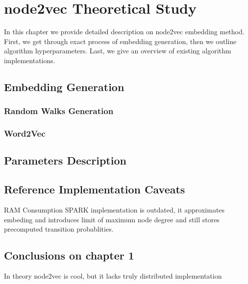 \chapter{node2vec Theoretical Study}\label{chap:1}
In this chapter we provide detailed description on node2vec embedding method. First, we get through exact process of embedding generation, then we outline algorithm hyperparameters. Last, we give an overview of existing algorithm implementations.

\section{Embedding Generation}
\subsection{Random Walks Generation}
\subsection{Word2Vec}

\section{Parameters Description}

\section{Reference Implementation Caveats}
RAM Consumption
SPARK implementation is outdated, it approximates embeding and introduces limit of maximum node degree and still stores precomputed transition probablities. 





\section{Conclusions on chapter 1}
In theory node2vec is cool, but it lacks truly distributed implementation
